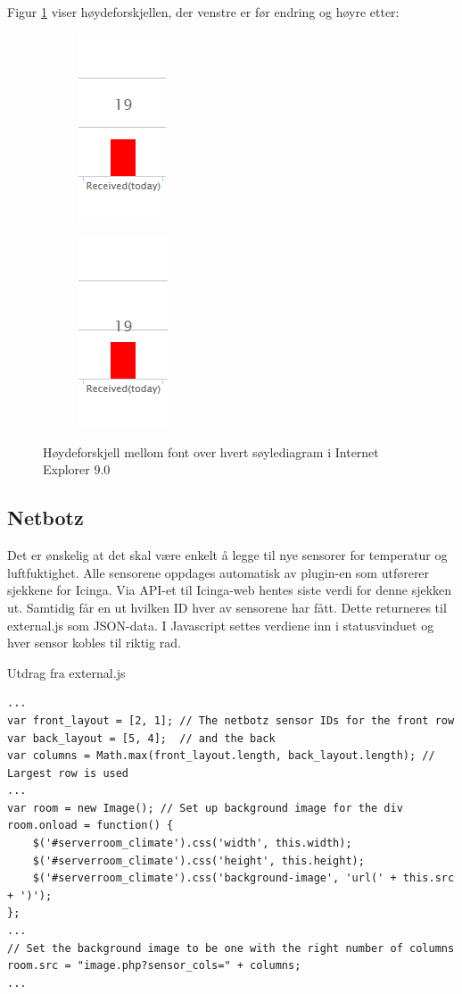 Figur \ref{IE_bug} viser høydeforskjellen, der venstre er før endring og høyre etter:
\begin{figure}[H]
\centering
\begin{subfigure}
  \centering
  \includegraphics[scale=0.7]{img/IE_footprints_bug}
\end{subfigure}
\begin{subfigure}
  \centering
  \includegraphics[scale=0.7]{img/IE_footprints_fix}
\end{subfigure}
\caption{Høydeforskjell mellom font over hvert søylediagram i Internet Explorer 9.0}
\label{IE_bug}
\end{figure}

\subsection{Netbotz}
Det er ønskelig at det skal være enkelt å legge til nye sensorer for temperatur og luftfuktighet. Alle sensorene oppdages automatisk av plugin-en som utførerer sjekkene for Icinga. Via API-et til Icinga-web hentes siste verdi for denne sjekken ut. Samtidig får en ut hvilken ID hver av sensorene har fått. Dette returneres til external.js som JSON-data. I Javascript settes verdiene inn i statusvinduet og hver sensor kobles til riktig rad.

Utdrag fra external.js
\begin{lstlisting}[style=example]
...
var front_layout = [2, 1]; // The netbotz sensor IDs for the front row
var back_layout = [5, 4];  // and the back
var columns = Math.max(front_layout.length, back_layout.length); // Largest row is used 
...
var room = new Image(); // Set up background image for the div
room.onload = function() {
    $('#serverroom_climate').css('width', this.width);
    $('#serverroom_climate').css('height', this.height);
    $('#serverroom_climate').css('background-image', 'url(' + this.src + ')');
};
...
// Set the background image to be one with the right number of columns
room.src = "image.php?sensor_cols=" + columns;
...
\end{lstlisting}

